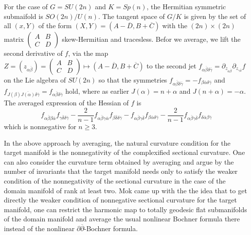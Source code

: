 For the case of $G=SU(2n)$ and $K =Sp(n)$, the Hermitian symmetric submaifold is $SO(2n)/U(n)$. The tangent space of $G/K$ is given by the set of all $(x, Y)$ of the form $(X, Y)= (A-\overline{D}, B + \overline{C})$ with the $(2n) \times (2n)$ matrix $\begin{pmatrix}
A  & B\\
C & D
\end{pmatrix}$ skew-Hermitian and tracesless. Befor we average, we lift the second derivative of $f$, via the map $Z=(z_{\alpha \overline{\beta}})= \begin{pmatrix}
A  & B\\
C & D
\end{pmatrix}
\mapsto (A- \overline{D}, B + \overline{C})$ to the second jet $f_{\alpha \overline{\beta}\delta \overline{\gamma}} =\partial_{z_{\alpha \overline{\beta}}} \partial_{z_{\gamma \overline{\delta}}}f$ on the Lie algebra of $SU(2n)$ so that the symmetries $f_{\alpha \overline{\beta}\delta\overline{\gamma}} = -f_{\beta \overline{\alpha}\delta \overline{\gamma}}$ and $f_{J(\beta)\overline{J(\alpha)}\delta\overline{\gamma}} =f_{\alpha \overline{\beta}\delta \overline{\gamma}}$ hold, where as earlier $J (\alpha) =n + \alpha$ and $J(n + \alpha)= -\alpha$. The averaged expression of the Hessian of $f$ is
$$
f_{\alpha \overline{\beta}\beta\overline{\alpha}}f_{\gamma \overline{\delta}\delta \overline{\gamma}} - \dfrac{2}{n-1}f_{\alpha\overline{\beta}\gamma \overline{\alpha}}f_{\beta\overline{\delta}\delta \overline{\gamma}} - f_{\alpha \overline{\beta}\gamma \overline{\delta}}f_{\beta \overline{\alpha}\delta \overline{\gamma}} -\dfrac{2}{n-1} f_{\alpha \overline{\beta}\gamma \overline{\delta}}f_{\delta \overline{\alpha}\beta \overline{\gamma}}
$$
which is nonnegative for $n \geq 3$.

In the above approach by averaging, the natural curvature condition for the target manifold is the nonnegativity of  the complexified sectional curvature. One can also consider the curvature term obtained by averaging and argue by the number of invariants that the target manifold needs only to satisfy the weaker condition of the nonnegativity of the sectional curvature in the case of the domain manifold of rank at least two. Mok came up with the the idea that to get directly the weaker condition of nonnegative sectional curvature for the target manifold, one can restrict the harmonic map to totally geodesic flat submanifolds of the domain manifold and average the usual nonlinear Bochner formula there instead of the nonlinear $\partial \overline{\partial}$-Bochner formula.

